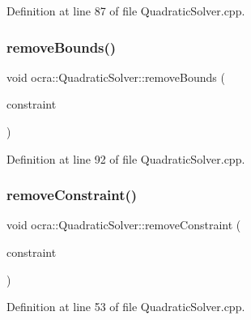 Definition at line 87 of file Quadratic\+Solver.\+cpp.

\hypertarget{classocra_1_1QuadraticSolver_ad3a761be1b05c23ab807effcdc710017}{}\label{classocra_1_1QuadraticSolver_ad3a761be1b05c23ab807effcdc710017} 
\subsubsection{\texorpdfstring{remove\+Bounds()}{removeBounds()}\hspace{0.1cm}{\footnotesize\ttfamily [2/2]}}
{\footnotesize\ttfamily void ocra\+::\+Quadratic\+Solver\+::remove\+Bounds (\begin{DoxyParamCaption}\item[{\hyperlink{namespaceocra_a5fc023ff4ef8f4b0cdf410e088090731}{Identity\+Constraint} \&}]{constraint }\end{DoxyParamCaption})}



Definition at line 92 of file Quadratic\+Solver.\+cpp.

\hypertarget{classocra_1_1QuadraticSolver_ab09f78e724adfb76c6b009c946404113}{}\label{classocra_1_1QuadraticSolver_ab09f78e724adfb76c6b009c946404113} 
\subsubsection{\texorpdfstring{remove\+Constraint()}{removeConstraint()}}
{\footnotesize\ttfamily void ocra\+::\+Quadratic\+Solver\+::remove\+Constraint (\begin{DoxyParamCaption}\item[{\hyperlink{namespaceocra_ae8b87cf4099be3efc3b410019ad2046e}{Linear\+Constraint} \&}]{constraint }\end{DoxyParamCaption})}



Definition at line 53 of file Quadratic\+Solver.\+cpp.

\hypertarget{classocra_1_1QuadraticSolver_aefd3a7556918d2073ab9ae8119f9f60c}{}\label{classocra_1_1QuadraticSolver_aefd3a7556918d2073ab9ae8119f9f60c} 
